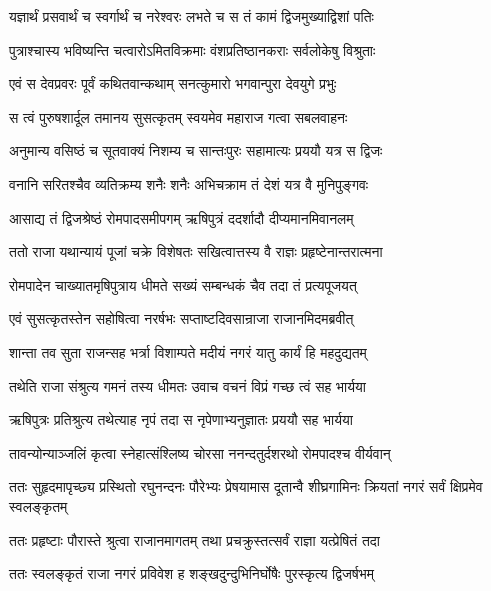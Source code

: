 \twolineshloka
{यज्ञार्थं प्रसवार्थं च स्वर्गार्थं च नरेश्वरः}
{लभते च स तं कामं द्विजमुख्याद्विशां पतिः} %

\twolineshloka
{पुत्राश्चास्य भविष्यन्ति चत्वारोऽमितविक्रमाः}
{वंशप्रतिष्ठानकराः सर्वलोकेषु विश्रुताः} %

\twolineshloka
{एवं स देवप्रवरः पूर्वं कथितवान्कथाम्}
{सनत्कुमारो भगवान्पुरा देवयुगे प्रभुः} %

\twolineshloka
{स त्वं पुरुषशार्दूल तमानय सुसत्कृतम्}
{स्वयमेव महाराज गत्वा सबलवाहनः} %

\twolineshloka
{अनुमान्य वसिष्ठं च सूतवाक्यं निशम्य च}
{सान्तःपुरः सहामात्यः प्रययौ यत्र स द्विजः} %

\twolineshloka
{वनानि सरितश्चैव व्यतिक्रम्य शनैः शनैः}
{अभिचक्राम तं देशं यत्र वै मुनिपुङ्गवः} %

\twolineshloka
{आसाद्य तं द्विजश्रेष्ठं रोमपादसमीपगम्}
{ऋषिपुत्रं ददर्शादौ दीप्यमानमिवानलम्} %

\twolineshloka
{ततो राजा यथान्यायं पूजां चक्रे विशेषतः}
{सखित्वात्तस्य वै राज्ञः प्रहृष्टेनान्तरात्मना} %

\twolineshloka
{रोमपादेन चाख्यातमृषिपुत्राय धीमते}
{सख्यं सम्बन्धकं चैव तदा तं प्रत्यपूजयत्} %

\twolineshloka
{एवं सुसत्कृतस्तेन सहोषित्वा नरर्षभः}
{सप्ताष्टदिवसान्राजा राजानमिदमब्रवीत्} %

\twolineshloka
{शान्ता तव सुता राजन्सह भर्त्रा विशाम्पते}
{मदीयं नगरं यातु कार्यं हि महदुद्यतम्} %

\twolineshloka
{तथेति राजा संश्रुत्य गमनं तस्य धीमतः}
{उवाच वचनं विप्रं गच्छ त्वं सह भार्यया} %

\twolineshloka
{ऋषिपुत्रः प्रतिश्रुत्य तथेत्याह नृपं तदा}
{स नृपेणाभ्यनुज्ञातः प्रययौ सह भार्यया} %

\twolineshloka
{तावन्योन्याञ्जलिं कृत्वा स्नेहात्संश्लिष्य चोरसा}
{ननन्दतुर्दशरथो रोमपादश्च वीर्यवान्} %

\threelineshloka
{ततः सुहृदमापृच्छ्य प्रस्थितो रघुनन्दनः}
{पौरेभ्यः प्रेषयामास दूतान्वै शीघ्रगामिनः}
{क्रियतां नगरं सर्वं क्षिप्रमेव स्वलङ्कृतम्} %

\twolineshloka
{ततः प्रहृष्टाः पौरास्ते श्रुत्वा राजानमागतम्}
{तथा प्रचक्रुस्तत्सर्वं राज्ञा यत्प्रेषितं तदा} %

\twolineshloka
{ततः स्वलङ्कृतं राजा नगरं प्रविवेश ह}
{शङ्खदुन्दुभिनिर्घोषैः पुरस्कृत्य द्विजर्षभम्} %

